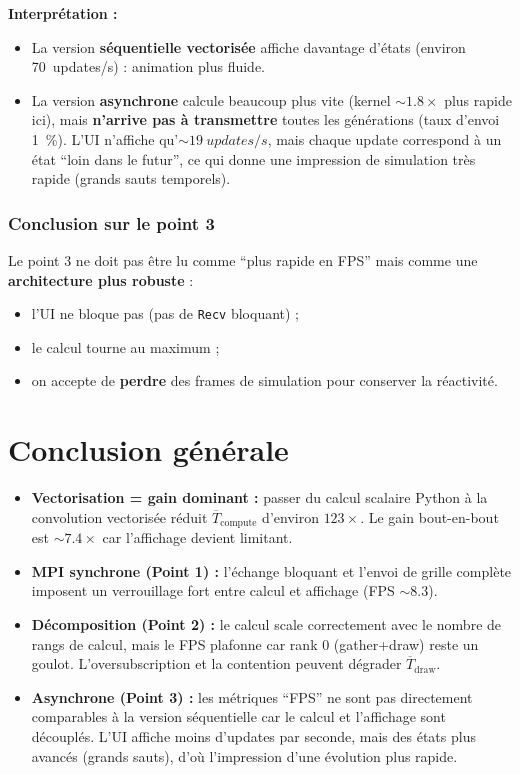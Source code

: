 \documentclass[11pt,a4paper]{article}
\begin{document}
\textbf{Interprétation :}
\begin{itemize}[leftmargin=1.2em]
  \item La version \textbf{séquentielle vectorisée} affiche davantage d’états (environ \SI{70}{updates/s}) : animation plus fluide.
  \item La version \textbf{asynchrone} calcule beaucoup plus vite (kernel $\sim 1.8\times$ plus rapide ici), mais \textbf{n’arrive pas à transmettre}
        toutes les générations (taux d’envoi \SI{1}{\%}). L’UI n’affiche qu’$\sim \SI{19}{updates/s}$, mais chaque update correspond à un état ``loin dans le futur'',
        ce qui donne une impression de simulation très rapide (grands sauts temporels).
\end{itemize}

\subsubsection{Conclusion sur le point 3}

Le point 3 ne doit pas être lu comme ``plus rapide en FPS'' mais comme une \textbf{architecture plus robuste} :
\begin{itemize}[leftmargin=1.2em]
  \item l’UI ne bloque pas (pas de \texttt{Recv} bloquant) ;
  \item le calcul tourne au maximum ;
  \item on accepte de \textbf{perdre} des frames de simulation pour conserver la réactivité.
\end{itemize}

\section{Conclusion générale}

\begin{itemize}[leftmargin=1.2em]
  \item \textbf{Vectorisation = gain dominant :} passer du calcul scalaire Python à la convolution vectorisée réduit $\overline{T}_{\text{compute}}$
        d’environ $123\times$. Le gain bout-en-bout est $\sim 7.4\times$ car l’affichage devient limitant.
  \item \textbf{MPI synchrone (Point 1) :} l’échange bloquant et l’envoi de grille complète imposent un verrouillage fort entre calcul et affichage
        (FPS $\sim 8.3$).
  \item \textbf{Décomposition (Point 2) :} le calcul scale correctement avec le nombre de rangs de calcul, mais le FPS plafonne car rank 0 (gather+draw)
        reste un goulot. L’oversubscription et la contention peuvent dégrader $\overline{T}_{\text{draw}}$.
  \item \textbf{Asynchrone (Point 3) :} les métriques ``FPS'' ne sont pas directement comparables à la version séquentielle car le calcul et l’affichage
        sont découplés. L’UI affiche moins d’updates par seconde, mais des états plus avancés (grands sauts), d’où l’impression d’une évolution plus rapide.
\end{itemize}
\end{document}
